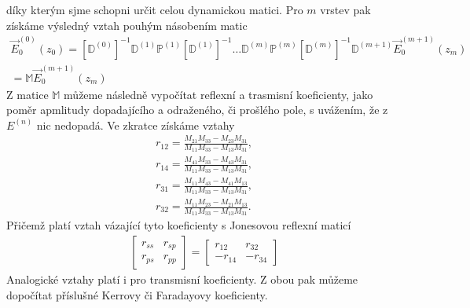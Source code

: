 díky kterým sjme schopni určit celou dynamickou matici.
Pro $m$ vrstev pak získáme výsledný vztah pouhým násobením matic
\begin{eqnarray}
\vec{E}_0^{(0)}(z_0) = [\mathbb{D}^{(0)}]^{-1}\mathbb{D}^{(1)}\mathbb{P}^{(1)}[\mathbb{D}^{(1)}]^{-1}\dots \mathbb{D}^{(m)}\mathbb{P}^{(m)}[\mathbb{D}^{(m)}]^{-1}\mathbb{D}^{(m+1)}\vec{E}_0^{(m+1)}(z_m)\\
=\mathbb{M}\vec{E}_0^{(m+1)}(z_m)
\end{eqnarray}
Z matice $\mathbb{M}$ můžeme následně vypočítat reflexní a trasmisní koeficienty, jako poměr apmlitudy dopadajícího a odraženého, či prošlého pole, s uvážením, že z $E^{(n)}$ nic nedopadá. Ve zkratce získáme vztahy %
\begin{eqnarray}
r_{12}=\frac{M_{21}M_{33} - M_{23}M_{31}}{M_{11}M_{33}-M_{13}M_{31}}, \\
r_{14}=\frac{M_{41}M_{33}-M_{43}M_{31}}{M_{11}M_{33}-M_{13}M_{31}}, \\
r_{31}=\frac{M_{11}M_{43}-M_{41}M_{13}}{M_{11}M_{33}-M_{13}M_{31}}, \\
r_{32}=\frac{M_{11}M_{23}-M_{21}M_{13}}{M_{11}M_{33}-M_{13}M_{31}}.
\end{eqnarray}
Přičemž platí vztah vázající tyto koeficienty s Jonesovou reflexní maticí
\begin{eqnarray}
\begin{bmatrix}
r_{ss} & r_{sp} \\ r_{ps} & r_{pp} 
\end{bmatrix}
= 
\begin{bmatrix} 
r_{12} &r_{32} \\ -r_{14} & -r_{34} 
\end{bmatrix}
\end{eqnarray}
Analogické vztahy platí i pro transmisní koeficienty. Z obou pak můžeme dopočítat příslušné Kerrovy či Faradayovy koeficienty.
